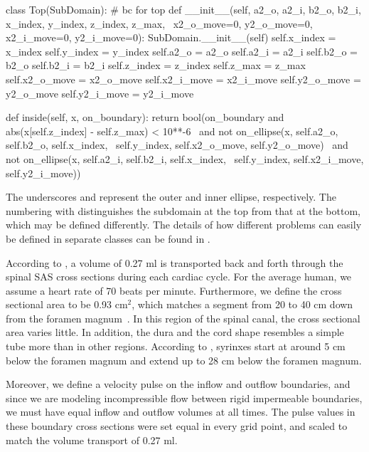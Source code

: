 \begin{python}
class Top(SubDomain): # bc for top
	def __init__(self, a2_o, a2_i, b2_o, b2_i, x_index, y_index, z_index, z_max, \
	             x2_o_move=0, y2_o_move=0, x2_i_move=0, y2_i_move=0):
		SubDomain.__init__(self)
		self.x_index = x_index
		self.y_index = y_index
		self.a2_o = a2_o
		self.a2_i = a2_i
		self.b2_o = b2_o
		self.b2_i = b2_i
		self.z_index = z_index
		self.z_max = z_max
		self.x2_o_move = x2_o_move
		self.x2_i_move = x2_i_move
		self.y2_o_move = y2_o_move
		self.y2_i_move = y2_i_move

	def inside(self, x, on_boundary):
		return bool(on_boundary and abs(x[self.z_index] - self.z_max) < 10**-6 \
		            and not on_ellipse(x, self.a2_o, self.b2_o, self.x_index, \
		                               self.y_index, self.x2_o_move, self.y2_o_move) \
		            and not on_ellipse(x, self.a2_i, self.b2_i, self.x_index, \
		                               self.y_index, self.x2_i_move, self.y2_i_move))
\end{python}

The underscores \emp{o} and \emp{i} represent the outer and inner
ellipse, respectively. The numbering with \emp{2} distinguishes the
subdomain at the top from that at the bottom, which may be defined
differently. The details of how different problems can easily be
defined in separate classes can be found in
\emp{src/mesh\_definitions/}. %

According to \citet{GuptaSoellingerBoesigerEtAl2009}, a volume of 0.27
ml is transported back and forth through the spinal SAS cross sections
during each cardiac cycle. For the average human, we assume a heart
rate of 70 beats per minute. Furthermore, we define the cross
sectional area to be 0.93 $\mathrm{cm^2}$, which matches a segment
from 20 to 40 cm down from the foramen
magnum~\citep{LothYardimciAlperin2001}. In this region of the spinal
canal, the cross sectional area varies little. In addition, the dura
and the cord shape resembles a simple tube more than in other regions.
According to \citet{OldfieldMuraszkoShawkerEtAl1994}, syrinxes start
at around 5 cm below the foramen magnum and extend up to 28 cm below
the foramen magnum.

Moreover, we define a velocity pulse on the inflow and outflow
boundaries, and since we are modeling incompressible flow between
rigid impermeable boundaries, we must have equal inflow and outflow
volumes at all times. The pulse values in these boundary cross
sections were set equal in every grid point, and scaled to match the
volume transport of 0.27 ml.

